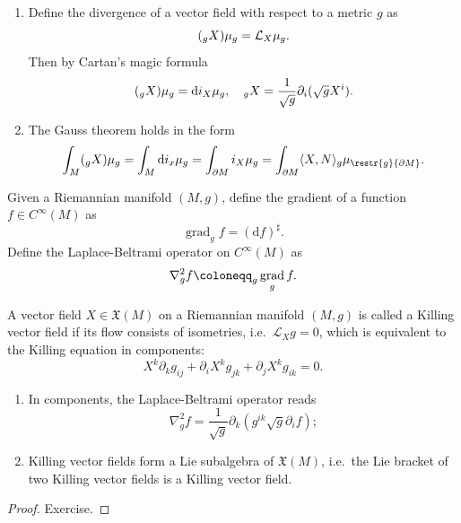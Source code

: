 \documentclass[english,letterpaper]{article}%
\numberwithin{equation}{section}
\numberwithin{figure}{section}
\numberwithin{table}{section}
\theoremstyle{definition}
\theoremstyle{definition}
\theoremstyle{definition}
\theoremstyle{plain}
\theoremstyle{plain}
\theoremstyle{plain}
\theoremstyle{plain}
\theoremstyle{remark}
\theoremstyle{remark}
\newcommand{\dd}{{\mathrm{d}}}
\DeclareMathOperator{\grad}{grad}
\let\div\relax
\DeclareMathOperator{\div}{div}
\newcommand{\Lie}{\mathcal{L}}
\newcommand{\fX}{\mathfrak{X}}
\begin{document}
\begin{cor}
    \begin{enumerate}
        \item Define the divergence of a vector field with respect to a metric $g$ as 
        \[(\div_g X)\mu_g=\Lie_X \mu_g.\]
        Then by Cartan's magic formula
        \[(\div_g X)\mu_g=\dd i_X \mu_g,\quad \div_g X=\frac{1}{\sqrt g}\partial_i(\sqrt g X^i).\label{divergence in components}\]
        \item The Gauss theorem holds in the form 
        \[\int_M (\div_g X)\mu_g=\int_M \dd i_x \mu_g=\int_{\partial M}i_X \mu_g=\int_{\partial M}\langle X,N\rangle_g \mu_{\restr{g}{\partial M}}.\]
    \end{enumerate}
\end{cor}

\begin{defn}
    Given a Riemannian manifold $(M,g)$, define the gradient  of a function $f\in C^\infty(M)$ as 
    \[\grad_g f=(\dd f)^\sharp.\]
    Define the Laplace-Beltrami operator  on $C^\infty(M)$ as
    \[\nabla^2_g f \coloneqq \div_g \grad_g f.\]
\end{defn}
\begin{defn}
    A vector field $X\in\fX(M)$ on a Riemannian manifold $(M,g)$ is called a Killing vector field if its flow consists of isometries, i.e.\ $\Lie_X g=0$, which is equivalent to the Killing equation in components:
    \[X^k\partial_k g_{ij}+\partial_i X^k g_{jk}+\partial_j X^k g_{ik}=0.\]
\end{defn}

\begin{cor}
    \begin{enumerate}
        \item In components, the Laplace-Beltrami operator reads 
        \[\nabla^2_g f=\frac{1}{\sqrt g}\partial_k (g^{ik}\sqrt g \partial_i f);\label{laplacian in components}\]
        \item Killing vector fields form a Lie subalgebra of $\fX(M)$, i.e.\ the Lie bracket of two Killing vector fields is a Killing vector field.
    \end{enumerate}
\end{cor}
\begin{proof}
    Exercise.
\end{proof}
\end{document}

